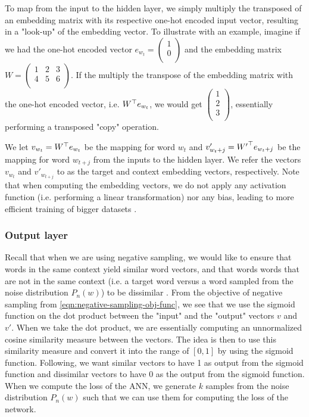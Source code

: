 To map from the input to the hidden layer, we simply multiply the transposed of an embedding matrix with its respective one-hot encoded input vector, resulting in a "look-up" of the embedding vector. To illustrate with an example, imagine if we had the one-hot encoded vector $e_{w_t} = \left( \begin{smallmatrix}
    1\\
    0\\
\end{smallmatrix} \right)$ and the embedding matrix $W = \left( \begin{smallmatrix}
    1 & 2 & 3\\
    4 & 5 & 6\\
\end{smallmatrix} \right)$. If the multiply the transpose of the embedding matrix with the one-hot encoded vector, i.e. ${W}^\top e_{w_t}$, we would get $\left( \begin{smallmatrix}
    1\\
    2\\
    3\\
\end{smallmatrix} \right)$, essentially performing a transposed "copy" operation.

We let $v_{w_t} = {W}^\top e_{w_t}$ be the mapping for word $w_t$ and $v'_{w_t+j} = {W'}^\top e_{w_t{+j}}$ be the mapping for word $w_{t+j}$ from the inputs to the hidden layer. We refer the vectors $v_{w_t}$ and $v'_{w_{t+j}}$ to as the target and context embedding vectors, respectively. Note that when computing the embedding vectors, we do not apply any activation function (i.e. performing a linear transformation) nor any bias, leading to more efficient training of bigger datasets \cite{mikolov2013a}.

\subsubsection{Output layer}
Recall that when we are using negative sampling, we would like to ensure that words in the same context yield similar word vectors, and that words words that are not in the same context (i.e. a target word versus a word sampled from the noise distribution $P_n(w)$) to be dissimilar \cite{mikolov2013b}. From the objective of negative sampling from \cref{eqn:negative-sampling-obj-func}, we see that we use the sigmoid function on the dot product between the "input" and the "output" vectors $v$ and $v'$. When we take the dot product, we are essentially computing an unnormalized cosine similarity measure between the vectors. The idea is then to use this similarity measure and convert it into the range of $[0, 1]$ by using the sigmoid function. Following, we want similar vectors to have 1 as output from the sigmoid function and dissimilar vectors to have 0 as the output from the sigmoid function. When we compute the loss of the ANN, we generate $k$ samples from the noise distribution $P_n(w)$ such that we can use them for computing the loss of the network.


